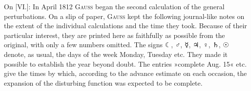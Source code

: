 \clearpage
\begingroup
{}
\renewcommand{\headrulewidth}{0pt}
\begingroup
\newcommand{\BJournalDay}[1]{{\upshape\AstroSymbols #1}}
\par\noindent\hspace*{\parindent}On [VI.]: In April 1812 \textsc{Gauss} began the second calculation of the
general perturbations. On a slip of paper,
\textsc{Gauss} kept the following journal-like notes on the extent of the individual calculations and the time they took.
Because of their particular interest, they are printed here as faithfully as possible
from the original, with only a few numbers omitted. The signs
\BJournalDay{☾}, \BJournalDay{♂}, \BJournalDay{☿}, \BJournalDay{♃},
\BJournalDay{♀}, \BJournalDay{♄}, \BJournalDay{☉} denote, as usual, the
days of the week Monday, Tuesday etc. They made it possible to establish the year beyond doubt.
The entries »complete Aug. 15« etc. give the times
by which, according to the advance estimate on each occasion,
the expansion of the disturbing function was expected to be
complete.

